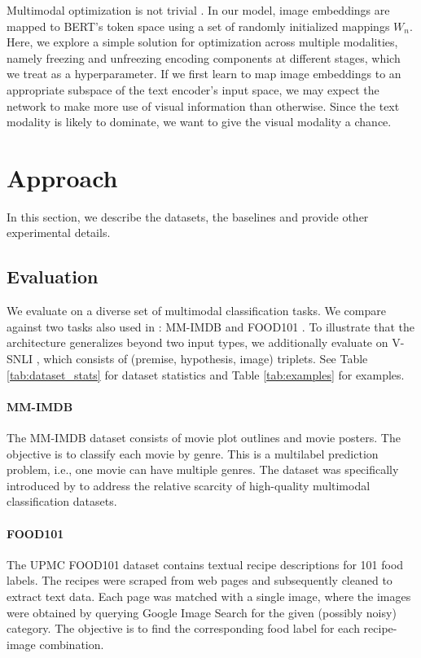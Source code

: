 \documentclass[11pt,a4paper]{article}
\begin{document}
Multimodal optimization is not trivial \cite{Wang:2019arxiv}. In our model, image embeddings are mapped to BERT's token space using a set of randomly initialized mappings $W_n$. Here, we explore a simple solution for optimization across multiple modalities, namely freezing and unfreezing encoding components at different stages, which we treat as a hyperparameter. If we first learn to map image embeddings to an appropriate subspace of the text encoder's input space, we may expect the network to make more use of visual information than otherwise. Since the text modality is likely to dominate, we want to give the visual modality a chance.

\section{Approach}

In this section, we describe the datasets, the baselines and provide other experimental details.

\subsection{Evaluation}
We evaluate on a diverse set of multimodal classification tasks. We compare against two tasks also used in \cite{Kiela:2018aaai}: MM-IMDB \cite{Arevalo:2017mmimdb} and FOOD101 \cite{Wang:2015food101}. To illustrate that the architecture generalizes beyond two input types, we additionally evaluate on V-SNLI \cite{Vu:2018vsnli}, which consists of (premise, hypothesis, image) triplets. 
See Table \ref{tab:dataset_stats} for dataset statistics and Table \ref{tab:examples} for examples.

\paragraph{MM-IMDB} The MM-IMDB dataset \cite{Arevalo:2017mmimdb} consists of movie plot outlines and movie posters. The objective is to classify each movie by genre. This is a multilabel prediction problem, i.e., one movie can have multiple genres. The dataset was specifically introduced by \cite{Arevalo:2017mmimdb} to address the relative scarcity of high-quality multimodal classification datasets.

\paragraph{FOOD101} The UPMC FOOD101 dataset \cite{Wang:2015food101} contains textual recipe descriptions for 101 food labels. The recipes were scraped from web pages and subsequently cleaned to extract text data. Each page was matched with a single image, where the images were obtained by querying Google Image Search for the given (possibly noisy) category. The objective is to find the corresponding food label for each recipe-image combination.
\end{document}
